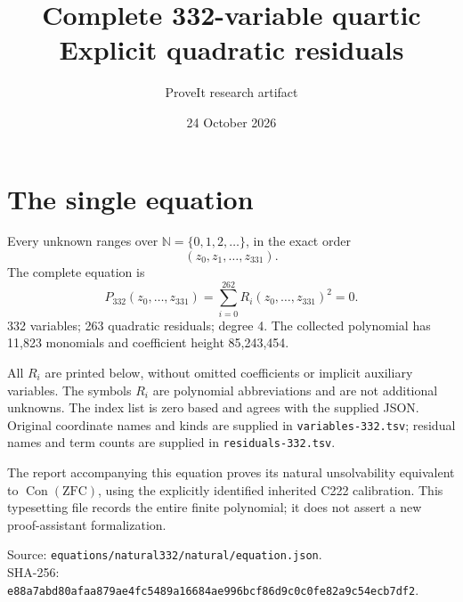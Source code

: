 \documentclass[10pt]{article}
\begin{document}
\title{Complete 332-variable quartic\\Explicit quadratic residuals}
\author{ProveIt research artifact}
\date{24 October 2026}
\maketitle
\section*{The single equation}
Every unknown ranges over $\mathbb N=\{0,1,2,\ldots\}$, in the exact order
\[
(z_0,z_1,\ldots,z_{331}).
\]
The complete equation is
\[
\boxed{P_{332}(z_0,\ldots,z_{331})=\sum_{i=0}^{262} R_i(z_0,\ldots,z_{331})^2=0.}
\]
332 variables; 263 quadratic residuals; degree 4. The collected polynomial has 11,823 monomials and coefficient height 85,243,454.

All $R_i$ are printed below, without omitted coefficients or implicit auxiliary variables. The symbols $R_i$ are polynomial abbreviations and are not additional unknowns. The index list is zero based and agrees with the supplied JSON. Original coordinate names and kinds are supplied in \texttt{variables-332.tsv}; residual names and term counts are supplied in \texttt{residuals-332.tsv}.

The report accompanying this equation proves its natural unsolvability equivalent to $\operatorname{Con}(\mathrm{ZFC})$, using the explicitly identified inherited C222 calibration. This typesetting file records the entire finite polynomial; it does not assert a new proof-assistant formalization.

Source: \texttt{equations/natural332/natural/equation.json}.\\
SHA-256: \texttt{\small e88a7abd80afaa879ae4fc5489a16684ae996bcf86d9c0c0fe82a9c54ecb7df2}.
\end{document}
